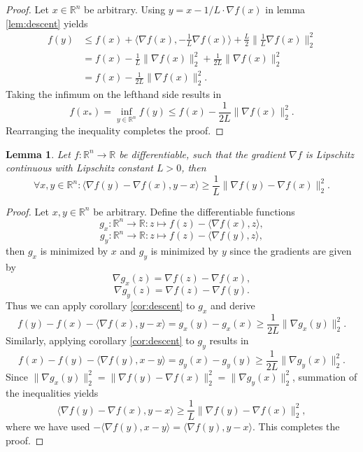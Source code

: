 \documentclass[11pt, a4paper]{article}
\newtheorem{lemma}[theorem]{Lemma}
\newcommand{\R}{\mathbb{R}}
\begin{document}
\begin{proof}
Let $x \in \R^n$ be arbitrary. Using $y = x - 1/L \cdot \nabla f(x)$ in lemma \ref{lem:descent} yields
\[ \begin{split} 
f(y) 
&\leq f(x) + \big \langle \nabla f(x) , - \frac{1}{L} \nabla f(x) \big \rangle + \frac{L}{2} \big \| \frac{1}{L} \nabla f(x) \big \|_2^2 \\\
&= f(x) - \frac{1}{L} \big \| \nabla f(x) \big \|_2^2 + \frac{1}{2L} \big \| \nabla f(x) \big \|_2^2 \\\
&= f(x) - \frac{1}{2L} \big \| \nabla f(x) \big \|_2^2.
\end{split} \]
Taking the infimum on the lefthand side results in
\[ f(x_*) = \inf_{y \in \R^n} f(y) \leq f(x) - \frac{1}{2L} \big \| \nabla f(x) \big \|_2^2. \]
Rearranging the inequality completes the proof.
\end{proof}

\begin{lemma} \label{lem:coercivity}
Let $f: \R^n \to \R$ be differentiable, such that the gradient $\nabla f$ is Lipschitz continuous with Lipschitz constant $L>0$, then
\[ \forall x,y \in \R^n : \big \langle \nabla f(y) - \nabla f(x),y-x \big \rangle \geq \frac{1}{L} \big \| \nabla f(y) - \nabla f(x) \big \|_2^2. \]
\end{lemma}

\begin{proof}
Let $x,y \in \R^n$ be arbitrary. Define the differentiable functions
\[ g_x: \R^n \to \R : z \mapsto f(z) - \big \langle \nabla f(x), z \big \rangle, \]
\[ g_y: \R^n \to \R : z \mapsto f(z) - \big \langle \nabla f(y), z \big \rangle, \]
then $g_x$ is minimized by $x$ and $g_y$ is minimized by $y$ since the gradients are given by
\[ \nabla g_x(z) = \nabla f(z) - \nabla f(x), \]
\[ \nabla g_y(z) = \nabla f(z) - \nabla f(y). \]
Thus we can apply corollary \ref{cor:descent} to $g_x$ and derive
\[ f(y) - f(x) - \big \langle \nabla f(x) , y-x \big \rangle = g_x(y) - g_x(x) \geq \frac{1}{2L} \big \| \nabla g_x(y) \big \|_2^2. \]
Similarly, applying corollary \ref{cor:descent} to $g_y$ results in
\[ f(x) - f(y) - \big \langle \nabla f(y) , x-y \big \rangle = g_y(x) - g_y(y) \geq \frac{1}{2L} \big \| \nabla g_y(x) \big \|_2^2. \]
Since $ \big \| \nabla g_x(y) \big \|_2^2 = \big \| \nabla f(y) - \nabla f(x) \big \|_2^2 = \big \| \nabla g_y(x) \big \|_2^2$, summation of the inequalities yields
\[ \big \langle \nabla f(y) - \nabla f(x),y-x \big \rangle \geq \frac{1}{L} \big \| \nabla f(y) - \nabla f(x) \big \|_2^2, \]
where we have used $- \big \langle \nabla f(y) , x-y \big \rangle = \big \langle \nabla f(y) , y-x \big \rangle$. This completes the proof.
\end{proof}
\end{document}
